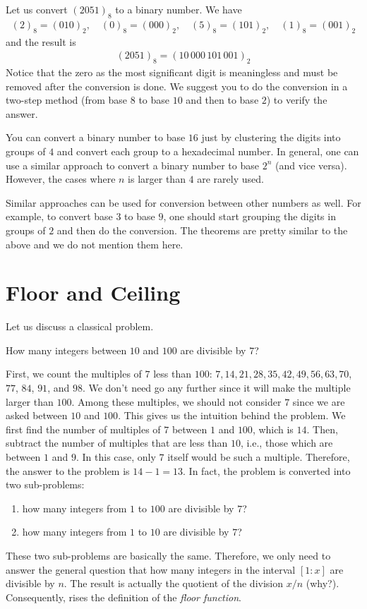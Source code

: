 \begin{example}
	Let us convert $(2051)_8$ to a binary number. We have
	\begin{align*}
		(2)_8=(\textit{010})_2, \quad (0)_8=(\textit{000})_2, \quad (5)_8=(\textit{101})_2, \quad (1)_8=(\textit{001})_2
	\end{align*}
	and the result is
	\begin{align*}
		(2051)_8 = (10\,000\,101\,001)_2
	\end{align*}
	Notice that the zero as the most significant digit is meaningless and must be removed after the conversion is done. We suggest you to do the conversion in a two-step method (from base $8$ to base $10$ and then to base $2$) to verify the answer.
\end{example}
You can convert a binary number to base $16$ just by clustering the digits into groups of $4$ and convert each group to a hexadecimal number. In general, one can use a similar approach to convert a binary number to base $2^n$ (and vice versa). However, the cases where $n$ is larger than $4$ are rarely used.

Similar approaches can be used for conversion between other numbers as well. For example, to convert base $3$ to base $9$, one should start grouping the digits in groups of $2$ and then do the conversion. The theorems are pretty similar to the above and we do not mention them here.
\section{Floor and Ceiling}
Let us discuss a classical problem.
\begin{problem} \label{floorproblem}
How many integers between $10$ and $100$ are divisible by $7$?
\end{problem}
First, we count the multiples of $7$ less than $100$: $7, 14, 21, 28, 35, 42, 49, 56, 63, 70$, $77$, $84$, $91$, and $98$. We don't need go any further since it will make the multiple larger than $100$. Among these multiples, we should not consider $7$ since we are asked between $10$ and $100$. This gives us the intuition behind the problem. We first find the number of multiples of $7$ between $1$ and $100$, which is $14$. Then, subtract the number of multiples that are less than $10$, i.e., those which are between $1$ and $9$. In this case, only $7$ itself would be such a multiple. Therefore, the answer to the problem is $14-1=13$. In fact, the problem is converted into two sub-problems:
\begin{enumerate}
\item how many integers from $1$ to $100$ are divisible by $7$?
\item how many integers from $1$ to $10$ are divisible by $7$?
\end{enumerate}
These two sub-problems are basically the same. Therefore, we only need to answer the general question that how many integers in the interval $[1:x]$ are divisible by $n$. The result is actually the quotient of the division $x/n$ (why?). Consequently, rises the definition of the \textit{floor function}.


